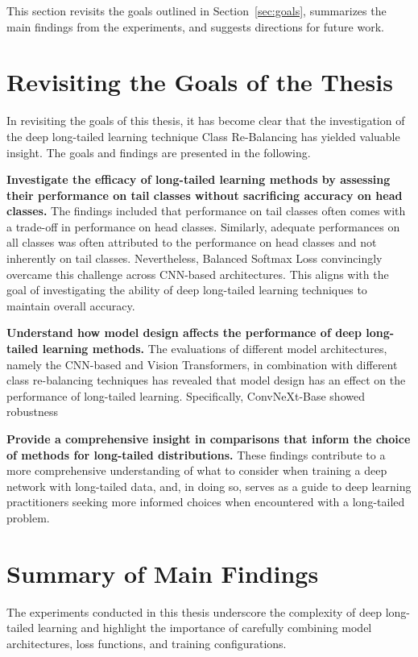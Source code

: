 This section revisits the goals outlined in Section~\ref{sec:goals}, summarizes the main findings from the experiments, and suggests directions for future work.

\section{Revisiting the Goals of the Thesis}
In revisiting the goals of this thesis, it has become clear that the investigation of the deep long-tailed learning technique Class Re-Balancing has yielded valuable insight. The goals and findings are presented in the following.

\noindent\textbf{Investigate the efficacy of long-tailed learning methods by assessing their performance on tail classes without sacrificing accuracy on head classes.}
The findings included that performance on tail classes often comes with a trade-off in performance on head classes. Similarly, adequate performances on all classes was often attributed to the performance on head classes and not inherently on tail classes. Nevertheless, Balanced Softmax Loss convincingly overcame this challenge across CNN-based architectures. This aligns with the goal of investigating the ability of deep long-tailed learning techniques to maintain overall accuracy. 

\noindent \textbf{Understand how model design affects the performance of deep long-tailed learning methods.}
The evaluations of different model architectures, namely the CNN-based and Vision Transformers, in combination with different class re-balancing techniques has revealed that model design has an effect on the performance of long-tailed learning. Specifically, ConvNeXt-Base showed robustness  

\noindent \textbf{Provide a comprehensive insight in comparisons that inform the choice of methods for long-tailed distributions.}
These findings contribute to a more comprehensive understanding of what to consider when training a deep network with long-tailed data, and, in doing so, serves as a guide to deep learning practitioners seeking more informed choices when encountered with a long-tailed problem.

\section{Summary of Main Findings}
The experiments conducted in this thesis underscore the complexity of deep long-tailed learning and highlight the importance of carefully combining model architectures, loss functions, and training configurations. 

